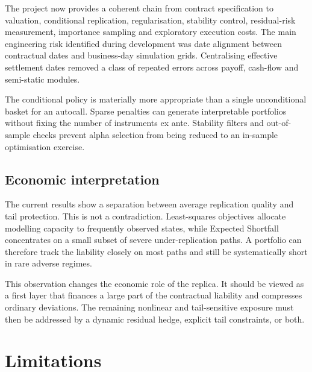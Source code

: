 \documentclass[11pt,a4paper]{article}
\begin{document}
The project now provides a coherent chain from contract specification to valuation, conditional replication, regularisation, stability control, residual-risk measurement, importance sampling and exploratory execution costs. The main engineering risk identified during development was date alignment between contractual dates and business-day simulation grids. Centralising effective settlement dates removed a class of repeated errors across payoff, cash-flow and semi-static modules.

The conditional policy is materially more appropriate than a single unconditional basket for an autocall. Sparse penalties can generate interpretable portfolios without fixing the number of instruments ex ante. Stability filters and out-of-sample checks prevent alpha selection from being reduced to an in-sample optimisation exercise.

\subsection{Economic interpretation}

The current results show a separation between average replication quality and tail protection. This is not a contradiction. Least-squares objectives allocate modelling capacity to frequently observed states, while Expected Shortfall concentrates on a small subset of severe under-replication paths. A portfolio can therefore track the liability closely on most paths and still be systematically short in rare adverse regimes.

This observation changes the economic role of the replica. It should be viewed as a first layer that finances a large part of the contractual liability and compresses ordinary deviations. The remaining nonlinear and tail-sensitive exposure must then be addressed by a dynamic residual hedge, explicit tail constraints, or both.

\section{Limitations}
\end{document}
